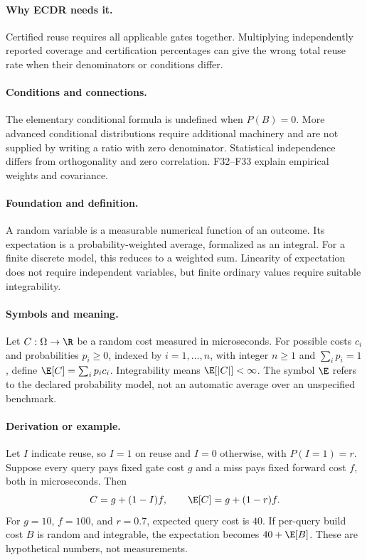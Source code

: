 \paragraph{Why ECDR needs it.}
Certified reuse requires all applicable gates together. Multiplying
independently reported coverage and certification percentages can give
the wrong total reuse rate when their denominators or conditions differ.
\paragraph{Conditions and connections.}
The elementary conditional formula is undefined when $P(B)=0$.
More advanced conditional distributions require additional machinery
and are not supplied by writing a ratio with zero denominator.
Statistical independence differs from orthogonality and zero
correlation. F32--F33 explain empirical weights and covariance.

\paragraph{Foundation and definition.}
A random variable is a measurable numerical function of an outcome.
Its expectation is a probability-weighted average, formalized as an
integral. For a finite discrete model, this reduces to a weighted sum.
Linearity of expectation does not require independent variables, but
finite ordinary values require suitable integrability.
\paragraph{Symbols and meaning.}
Let $C:\Omega\to\R$ be a random cost measured in microseconds.
For possible costs $c_i$ and probabilities $p_i\ge0$, indexed by
$i=1,\ldots,n$, with integer $n\ge1$ and $\sum_i p_i=1$, define
$\E[C]=\sum_i p_i c_i$. Integrability means
$\E[|C|]<\infty$. The symbol $\E$ refers to the declared probability
model, not an automatic average over an unspecified benchmark.
\paragraph{Derivation or example.}
Let $I$ indicate reuse, so $I=1$ on reuse and $I=0$ otherwise, with
$P(I=1)=r$. Suppose every query pays fixed gate cost $g$ and a miss
pays fixed forward cost $f$, both in microseconds. Then
\[
 C=g+(1-I)f,\qquad \E[C]=g+(1-r)f.
\]
For $g=10$, $f=100$, and $r=0.7$, expected query cost is $40$.
If per-query build cost $B$ is random and integrable, the expectation
becomes $40+\E[B]$. These are hypothetical numbers, not measurements.
